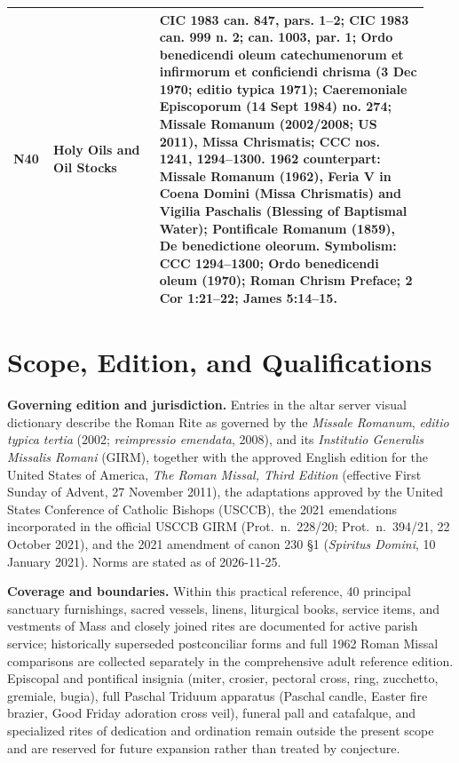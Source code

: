 {\begin{longtable}{>{\raggedright\arraybackslash}p{0.08\linewidth}>{\raggedright\arraybackslash}p{0.24\linewidth}>{\raggedright\arraybackslash}p{0.61\linewidth}}
\textbf{N40} & \textbf{Holy Oils and Oil Stocks} & CIC 1983 can. 847, pars. 1--2; CIC 1983 can. 999 n. 2; can. 1003, par. 1; Ordo benedicendi oleum catechumenorum et infirmorum et conficiendi chrisma (3 Dec 1970; editio typica 1971); Caeremoniale Episcoporum (14 Sept 1984) no. 274; Missale Romanum (2002/2008; US 2011), Missa Chrismatis; CCC nos. 1241, 1294--1300. 1962 counterpart: Missale Romanum (1962), Feria V in Coena Domini (Missa Chrismatis) and Vigilia Paschalis (Blessing of Baptismal Water); Pontificale Romanum (1859), De benedictione oleorum. Symbolism: CCC 1294--1300; Ordo benedicendi oleum (1970); Roman Chrism Preface; 2 Cor 1:21--22; James 5:14--15. \\
\bottomrule
\end{longtable}}

\clearpage
\section{Scope, Edition, and Qualifications}
\textbf{Governing edition and jurisdiction.} Entries in the altar server visual dictionary describe the Roman Rite as governed by the \textit{Missale Romanum}, \textit{editio typica tertia} (2002; \textit{reimpressio emendata}, 2008), and its \textit{Institutio Generalis Missalis Romani} (GIRM), together with the approved English edition for the United States of America, \textit{The Roman Missal, Third Edition} (effective First Sunday of Advent, 27 November 2011), the adaptations approved by the United States Conference of Catholic Bishops (USCCB), the 2021 emendations incorporated in the official USCCB GIRM (Prot.~n.~228/20; Prot.~n.~394/21, 22 October 2021), and the 2021 amendment of canon 230 \S1 (\textit{Spiritus Domini}, 10 January 2021). Norms are stated as of 2026-11-25.

\textbf{Coverage and boundaries.} Within this practical reference, 40 principal sanctuary furnishings, sacred vessels, linens, liturgical books, service items, and vestments of Mass and closely joined rites are documented for active parish service; historically superseded postconciliar forms and full 1962 Roman Missal comparisons are collected separately in the comprehensive adult reference edition. Episcopal and pontifical insignia (miter, crosier, pectoral cross, ring, zucchetto, gremiale, bugia), full Paschal Triduum apparatus (Paschal candle, Easter fire brazier, Good Friday adoration cross veil), funeral pall and catafalque, and specialized rites of dedication and ordination remain outside the present scope and are reserved for future expansion rather than treated by conjecture.

